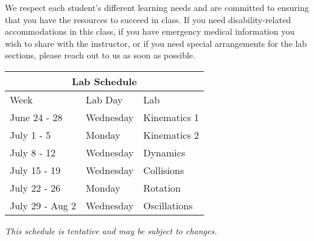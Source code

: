 \documentclass[11pt]{article}
\theoremstyle{gangnamstyle}{\newtheorem{definition}{Definition}[]}
\theoremstyle{gangnamstyle}{\newtheorem{example}{Example}[]}
\theoremstyle{gangnamstyle}{\newtheorem{problem}{Problem}[]}
\theoremstyle{gangnamstyle}{\newtheorem{warning}{Warning}[]}
\begin{document}
We respect each student's different learning needs and are committed to ensuring that you have the resources to succeed in class. If you need disability-related accommodations in this class, if you have emergency medical information you wish to share with the instructor, or if you need special arrangements for the lab sections, please reach out to us as soon as possible. 

\begin{center}
\begin{tabular}{ |p{3cm}|p{3cm}|p{3cm}|  }
\hline
\multicolumn{3}{|c|}{Lab Schedule} \\
\hline
Week & Lab Day & Lab \\
\hline
June 24 - 28 & Wednesday & Kinematics 1 \\
July 1 - 5 & Monday &  Kinematics 2 \\
July 8 - 12 & Wednesday & Dynamics \\
July 15 - 19 & Wednesday & Collisions \\
July 22 - 26 & Monday & Rotation \\
July 29 - Aug 2 & Wednesday & Oscillations \\
\hline
\end{tabular}

\textit{This schedule is tentative and may be subject to changes.}
\end{center}
\end{document}
